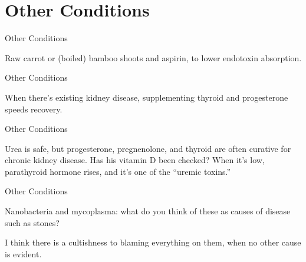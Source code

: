\documentclass[11pt,oneside,openany,extrafontsizes]{memoir}
\begin{document}
\section{Other Conditions}

\begin{standalonequote}{Other Conditions}

    \begin{answer}
        Raw carrot or (boiled) bamboo shoots and aspirin, to lower endotoxin absorption.
    \end{answer}
\end{standalonequote}

\begin{standalonequote}{Other Conditions}

    \begin{answer}
        When there's existing kidney disease, supplementing thyroid and progesterone speeds recovery.
    \end{answer}
\end{standalonequote}

\begin{standalonequote}{Other Conditions}

    \begin{answer}
        Urea is safe, but progesterone, pregnenolone, and thyroid are often curative for chronic kidney disease. Has his vitamin D been checked? When it's low, parathyroid hormone rises, and it's one of the \enquote{uremic toxins.}
    \end{answer}
\end{standalonequote}

\begin{qaexchange}{Other Conditions}

    \begin{question}
        Nanobacteria and mycoplasma: what do you think of these as causes of disease such as stones?
    \end{question}

    \begin{answer}
        I think there is a cultishness to blaming everything on them, when no other cause is evident.
    \end{answer}
\end{qaexchange}
\end{document}
